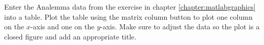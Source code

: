 {Enter the Analemma data from the exercise in chapter \ref{chapter:matlabgraphics} into a table.  Plot the table using the matrix column button to plot one column on the $x$-axis and one on the $y$-axis.  Make sure to adjust the data so the plot is a closed figure and add an appropriate title.}
{}
